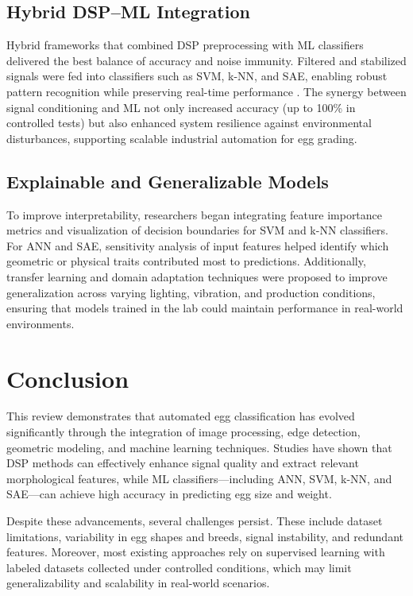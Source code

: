 \documentclass[conference]{IEEEtran}
\begin{document}
	\subsection{Hybrid DSP–ML Integration}
	
	Hybrid frameworks that combined DSP preprocessing with ML classifiers delivered the best balance of accuracy and noise immunity. Filtered and stabilized signals were fed into classifiers such as SVM, k-NN, and SAE, enabling robust pattern recognition while preserving real-time performance \cite{secil2020}\cite{yabanova2025}. The synergy between signal conditioning and ML not only increased accuracy (up to 100\% in controlled tests) but also enhanced system resilience against environmental disturbances, supporting scalable industrial automation for egg grading.
	
	\subsection{Explainable and Generalizable Models}
	
	To improve interpretability, researchers began integrating feature importance metrics and visualization of decision boundaries for SVM and k-NN classifiers. For ANN and SAE, sensitivity analysis of input features helped identify which geometric or physical traits contributed most to predictions. Additionally, transfer learning and domain adaptation techniques were proposed to improve generalization across varying lighting, vibration, and production conditions, ensuring that models trained in the lab could maintain performance in real-world environments.
	
	\section{Conclusion}
	This review demonstrates that automated egg classification has evolved significantly through the integration of image processing, edge detection, geometric modeling, and machine learning techniques. Studies have shown that DSP methods can effectively enhance signal quality and extract relevant morphological features, while ML classifiers—including ANN, SVM, k-NN, and SAE—can achieve high accuracy in predicting egg size and weight.
	
	Despite these advancements, several challenges persist. These include dataset limitations, variability in egg shapes and breeds, signal instability, and redundant features. Moreover, most existing approaches rely on supervised learning with labeled datasets collected under controlled conditions, which may limit generalizability and scalability in real-world scenarios. 
	
\end{document}
